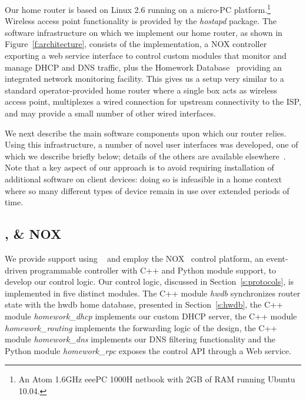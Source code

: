 Our home router is based on Linux 2.6 running on a micro-PC
platform.\footnote{An Atom 1.6GHz eeePC 1000H netbook with 2GB of RAM running
  Ubuntu 10.04.} Wireless access point functionality is provided by the
\emph{hostapd} package.  The software infrastructure on which we implement our
home router, as shown in Figure~\ref{f:architecture}, consists of the \ovs \of
implementation, a NOX controller exporting a web service interface to control
custom modules that monitor and manage DHCP and DNS traffic, plus the Homework
Database~ providing
an integrated network monitoring facility.  This gives us a setup very similar
to a standard operator-provided home router where a single box acts as wireless
access point, multiplexes a wired connection for upstream connectivity to the
ISP, and may provide a small number of other wired interfaces. 
                                                                    
We next describe the main software components upon which our router relies.
Using this infrastructure, a number of novel user interfaces was developed, one of
which we describe briefly below; details of the others are available
elsewhere~.  Note that a key
aspect of our approach is to avoid requiring installation of additional
software on client devices: doing so is infeasible in a home context where so
many different types of device remain in use over extended periods of time.

\subsection{\of, \ovs \& NOX} \label{s:openflow}

We provide \of support using \ovs~ and employ the
NOX~ control platform, an event-driven programmable controller with
C++ and Python module support, to develop our control logic.  Our control logic,
discussed in Section~\ref{s:protocols}, is implemented in five distinct modules.
The C++ module \textit{hwdb} synchronizes router state with the hwdb home
database, presented in Section~\ref{s:hwdb}, the C++ module
\textit{homework\_dhcp} implements our custom DHCP server, the C++ module
\textit{homework\_routing} implements the forwarding logic of the design, the
C++ module \textit{homework\_dns} implements our DNS filtering functionality and
the Python module \textit{homework\_rpc} exposes the control API through a Web
service. 

